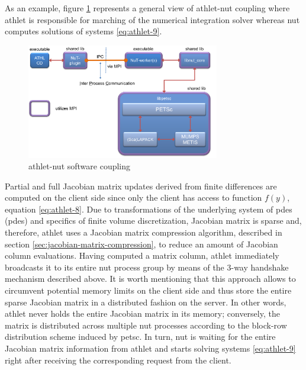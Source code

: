 As an example, figure \ref{fig:introduction-athlet-nut-coupling} represents a general view of \acrshort{athlet}-\acrshort{nut} coupling where \acrshort{athlet} is responsible for marching of the numerical integration solver whereas \acrshort{nut} computes solutions of systems \ref{eq:athlet-9}.\\


\figpointer{\ref{fig:introduction-athlet-nut-coupling}}
\begin{figure}
  \centering
  \includegraphics[width=0.75\textwidth]{figures/introduction-athlet-nut-coupling.png}
    \caption{\acrshort{athlet}-\acrshort{nut} software coupling}
\label{fig:introduction-athlet-nut-coupling}
\end{figure}


Partial and full Jacobian matrix updates derived from finite differences are computed on the client side since only the client has access to function $f(y)$, equation \ref{eq:athlet-8}. Due to transformations of the underlying system of \acrlong{pde}s (\acrshort{pde}s) and specifics of finite volume discretization, Jacobian matrix is sparse and, therefore, \acrshort{athlet} uses a Jacobian matrix compression algorithm, described in section \ref{sec:jacobian-matrix-compression}, to reduce an amount of Jacobian column evaluations. Having computed a matrix column, \acrshort{athlet} immediately broadcasts it to its entire \acrshort{nut} process group by means of the 3-way handshake mechanism described above. It is worth mentioning that this approach allows to circumvent potential memory limits on the client side and thus store the entire sparse Jacobian matrix in a distributed fashion on the server. In other words, \acrshort{athlet} never holds the entire Jacobian matrix in its memory; conversely, the matrix is distributed across multiple \acrshort{nut} processes according to the block-row distribution scheme induced by \acrshort{petsc}. In turn, \acrshort{nut} is waiting for the entire Jacobian matrix information from \acrshort{athlet} and starts solving systems \ref{eq:athlet-9} right after receiving the corresponding request from the client.\\


